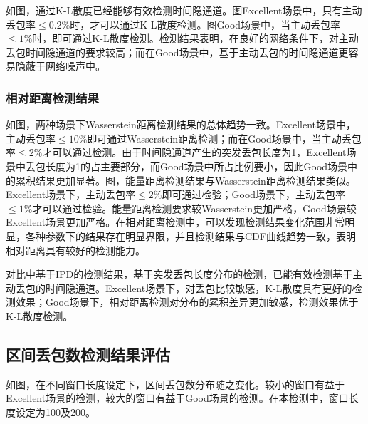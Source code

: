 如图，通过K-L散度已经能够有效检测时间隐通道。图Excellent场景中，只有主动丢包率$\le 0.2\%$时，才可以通过K-L散度检测。图Good场景中，当主动丢包率$\le 1\%$时，即可通过K-L散度检测。检测结果表明，在良好的网络条件下，对主动丢包时间隐通道的要求较高；而在Good场景中，基于主动丢包的时间隐通道更容易隐蔽于网络噪声中。

\subsubsection{相对距离检测结果}
\label{chap:analyze:result:burst:distance}

如图，两种场景下Wasserstein距离检测结果的总体趋势一致。Excellent场景中，主动丢包率$\le 10\%$即可通过Wasserstein距离检测；而在Good场景中，当主动丢包率$\le 2\%$才可以通过检测。由于时间隐通道产生的突发丢包长度为1，Excellent场景中丢包长度为1的占主要部分，而Good场景中所占比例要小，因此Good场景中的累积结果更加显著。图，能量距离检测结果与Wasserstein距离检测结果类似。Excellent场景下，主动丢包率$\le 2\%$即可通过检验；Good场景下，主动丢包率$\le 1\%$才可以通过检验。能量距离检测要求较Wasserstein更加严格，Good场景较Excellent场景更加严格。在相对距离检测中，可以发现检测结果变化范围非常明显，各种参数下的结果存在明显界限，并且检测结果与CDF曲线趋势一致，表明相对距离具有较好的检测能力。

对比中基于IPD的检测结果，基于突发丢包长度分布的检测，已能有效检测基于主动丢包的时间隐通道。Excellent场景下，对丢包比较敏感，K-L散度具有更好的检测效果；Good场景下，相对距离检测对分布的累积差异更加敏感，检测效果优于K-L散度检测。

\subsection{区间丢包数检测结果评估}
\label{chap:analyze:result:window}

如图，在不同窗口长度设定下，区间丢包数分布随之变化。较小的窗口有益于Excellent场景的检测，较大的窗口有益于Good场景的检测。在本检测中，窗口长度设定为100及200。

